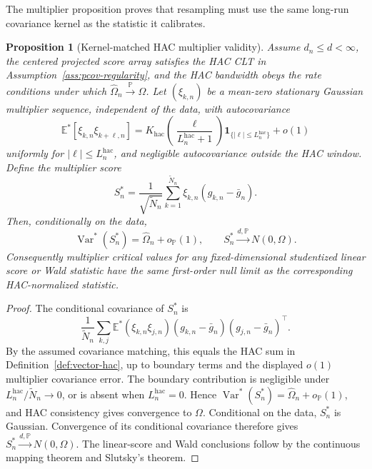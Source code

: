 \documentclass[11pt,a4paper]{amsart}
\theoremstyle{plain}
\newtheorem{proposition}[theorem]{Proposition}
\theoremstyle{definition}
\theoremstyle{remark}
\DeclareMathOperator{\Var}{Var}
\newcommand{\PP}{\mathbb{P}}
\newcommand{\EE}{\mathbb{E}}
\newcommand{\one}{\mathbf{1}}
\newcommand{\toP}{\xrightarrow{\PP}}
\begin{document}
The multiplier proposition proves that resampling must use the same long-run covariance kernel as
the statistic it calibrates.

\begin{proposition}[Kernel-matched HAC multiplier validity]\label{prop:kernel-matched-multiplier}
Assume \(d_n\le d<\infty\), the centered projected score array satisfies the HAC CLT in
Assumption~\ref{ass:pcov-regularity}, and the HAC bandwidth obeys the rate conditions under which
\(\widehat\Omega_n\toP\Omega\).  Let \((\xi_{k,n})\) be a mean-zero stationary Gaussian multiplier
sequence, independent of the data, with autocovariance
\[
        \EE^*[\xi_{k,n}\xi_{k+\ell,n}]
        =
        K_{\mathrm{hac}}\!\left(\frac{\ell}{L_n^{\mathrm{hac}}+1}\right)
        \one_{\{|\ell|\le L_n^{\mathrm{hac}}\}}
        +o(1)
\]
uniformly for \(|\ell|\le L_n^{\mathrm{hac}}\), and negligible autocovariance outside the HAC
window.  Define the multiplier score
\[
        S_n^*
        =
        \frac1{\sqrt{\widetilde N_n}}
        \sum_{k=1}^{\widetilde N_n}
        \xi_{k,n}(g_{k,n}-\bar g_n).
\]
Then, conditionally on the data,
\[
        \Var^*(S_n^*)=\widehat\Omega_n+o_{\PP}(1),
        \qquad
        S_n^*\xrightarrow{d,\PP}N(0,\Omega).
\]
Consequently multiplier critical values for any fixed-dimensional studentized linear score or Wald
statistic have the same first-order null limit as the corresponding HAC-normalized statistic.
\end{proposition}

\begin{proof}
The conditional covariance of \(S_n^*\) is
\[
        \frac1{\widetilde N_n}
        \sum_{k,j}
        \EE^*(\xi_{k,n}\xi_{j,n})
        (g_{k,n}-\bar g_n)(g_{j,n}-\bar g_n)^\top .
\]
By the assumed covariance matching, this equals the HAC sum in
Definition~\ref{def:vector-hac}, up to boundary terms and the displayed \(o(1)\) multiplier
covariance error.  The boundary contribution is negligible under
\(L_n^{\mathrm{hac}}/\widetilde N_n\to0\), or is absent when \(L_n^{\mathrm{hac}}=0\).  Hence
\(\Var^*(S_n^*)=\widehat\Omega_n+o_{\PP}(1)\), and HAC consistency gives convergence to
\(\Omega\).  Conditional on the data, \(S_n^*\) is Gaussian.  Convergence of its conditional
covariance therefore gives \(S_n^*\xrightarrow{d,\PP}N(0,\Omega)\).  The linear-score and Wald
conclusions follow by the continuous mapping theorem and Slutsky's theorem.
\end{proof}
\end{document}

